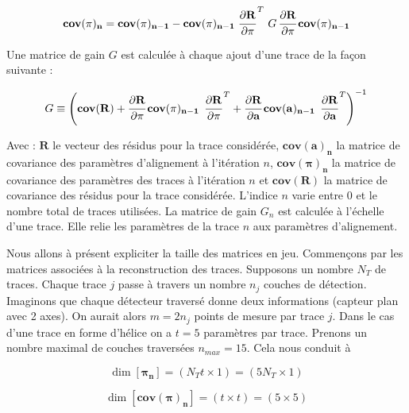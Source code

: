 \begin{appendices}
   \begin{equation}
    \mathbf{cov(\pi)_{n}} = \mathbf{cov(\pi)_{n-1}} -  \mathbf{cov(\pi)_{n-1}} \left. \cfrac{ \partial \mathbf{R} }{ \partial \mathbf{\pi} } \right.^T \, G \, \cfrac{ \partial \mathbf{R} }{ \partial \mathbf{\pi} } \, \mathbf{cov(\pi)_{n-1}}
   \end{equation}
   
   Une matrice de gain $G$ est calcul\'ee \`a chaque ajout d'une trace de la façon suivante :
   
   \begin{equation}
    G \equiv \left( \mathbf{cov(R)} + \cfrac{ \partial \mathbf{R} }{ \partial \mathbf{\pi} } \, \mathbf{cov(\pi)_{n-1}} \,  \left. \cfrac{ \partial \mathbf{R} }{ \partial \mathbf{\pi} } \right.^T +  \cfrac{ \partial \mathbf{R} }{ \partial \mathbf{a} } \, \mathbf{cov(a)_{n-1}} \, \left. \cfrac{ \partial \mathbf{R} }{ \partial \mathbf{a} } \right.^T  \right)^{-1}
   \end{equation}

   Avec : $\mathbf{R}$ le vecteur des r\'esidus pour la trace consid\'er\'ee, $\mathbf{cov(a)_{n}}$ la matrice de covariance des param\`etres d'alignement \`a l'it\'eration $n$, $\mathbf{cov(\pi)_{n}}$ la matrice de covariance des param\`etres des traces \`a l'it\'eration $n$ et $\mathbf{cov(R)}$ la matrice de covariance des r\'esidus pour la trace consid\'er\'ee. L'indice $n$ varie entre $0$ et le nombre total de traces utilis\'ees. La matrice de gain $G_n$ est calcul\'ee \`a l'\'echelle d'une trace. Elle relie les param\`etres de la trace $n$ aux param\`etres d'alignement.
  
   \medskip
   
   Nous allons \`a pr\'esent expliciter la taille des matrices en jeu. Commençons par les matrices associ\'ees \`a la reconstruction des traces. Supposons un nombre $N_T$ de traces. Chaque trace $j$ passe \`a travers un nombre $n_j$ couches de d\'etection. Imaginons que chaque d\'etecteur travers\'e donne deux informations (capteur plan avec 2 axes). On aurait alors $m=2n_j$ points de mesure par trace $j$. Dans le cas d'une trace en forme d'h\'elice on a $t=5$ param\`etres par trace. Prenons un nombre maximal de couches travers\'ees $n_{max} = 15$. Cela nous conduit \`a 
   
   \begin{equation}
    \dim[\mathbf{\pi_n}] = (N_T t \times 1) = (5 N_T \times 1)
   \end{equation}

    \begin{equation}
    \dim[\mathbf{cov(\pi)_{n}}] = (t \times t) = (5 \times 5)
   \end{equation}
   

\end{appendices}
